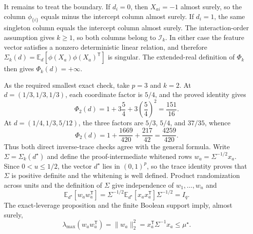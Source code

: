 It remains to treat the boundary.  If \(d_i=0\), then \(X_{ai}=-1\) almost surely, so the column \(\phi_{\{i\}}\) equals minus the intercept column almost surely.  If \(d_i=1\), the same singleton column equals the intercept column almost surely.  The interaction-order assumption gives \(k\ge1\), so both columns belong to \(\mathcal I_k\).  In either case the feature vector satisfies a nonzero deterministic linear relation, and therefore \(\Sigma_k(d)=\mathbb E_d[\phi(X_a)\phi(X_a)^{\mathsf T}]\) is singular.  The extended-real definition of \(\Phi_k\) then gives \(\Phi_k(d)=+\infty\).

As the required smallest exact check, take \(p=3\) and \(k=2\).  At \(d=(1/3,1/3,1/3)\), each coordinate factor is \(5/4\), and the proved identity gives
\[
 \Phi_2(d)=1+3\frac54+3\left(\frac54\right)^2=\frac{151}{16}.
\]
At \(d=(1/4,1/3,5/12)\), the three factors are \(5/3\), \(5/4\), and \(37/35\), whence
\[
 \Phi_2(d)=1+\frac{1669}{420}+\frac{217}{42}=\frac{4259}{420}.
\]
Thus both direct inverse-trace checks agree with the general formula.
Write \(\Sigma=\Sigma_k(d^\star)\) and define the proof-intermediate whitened rows \(w_a=\Sigma^{-1/2}x_a\).  Since \(0<u\le1/2\), the vector \(d^\star\) lies in \((0,1)^p\), so the trace identity proves that \(\Sigma\) is positive definite and the whitening is well defined.  Product randomization across units and the definition of \(\Sigma\) give independence of \(w_1,\ldots,w_n\) and
\[
 \mathbb E_{d^\star}[w_aw_a^{\mathsf T}]
 =\Sigma^{-1/2}\mathbb E_{d^\star}[x_ax_a^{\mathsf T}]\Sigma^{-1/2}
 =I_q.
\]
The exact-leverage proposition and the finite Boolean support imply, almost surely,
\[
 \lambda_{\max}(w_aw_a^{\mathsf T})
 =\|w_a\|_2^2
 =x_a^{\mathsf T}\Sigma^{-1}x_a
 \le\mu^\star. \tag{1}
\]

